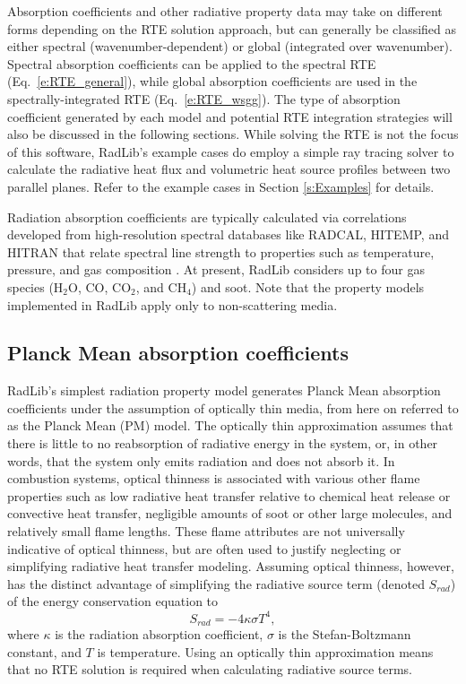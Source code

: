 \documentclass[preprint,12pt]{elsarticle}
\begin{document}
Absorption coefficients and other radiative property data may take on different forms depending on the RTE solution approach, but can generally be classified as either spectral (wavenumber-dependent) or global (integrated over wavenumber). Spectral absorption coefficients can be applied to the spectral RTE (Eq.~\ref{e:RTE_general}), while global absorption coefficients are used in the spectrally-integrated RTE (Eq.~\ref{e:RTE_wsgg}). The type of absorption coefficient generated by each model and potential RTE integration strategies will also be discussed in the following sections. While solving the RTE is not the focus of this software, RadLib's example cases do employ a simple ray tracing solver to calculate the radiative heat flux and volumetric heat source profiles between two parallel planes. Refer to the example cases in Section \ref{s:Examples} for details. 

Radiation absorption coefficients are typically calculated via correlations developed from high-resolution spectral databases like RADCAL, HITEMP, and HITRAN \citep{Grosshandler_1993,Rothman_2010} that relate spectral line strength to properties such as temperature, pressure, and gas composition \citep{Zhang_2002b}. At present, RadLib considers up to four gas species (H$_2$O, CO, CO$_2$, and CH$_4$) and soot. Note that the property models implemented in RadLib apply only to non-scattering media. 


\subsection{Planck Mean absorption coefficients} \label{s:planckmean}

RadLib's simplest radiation property model generates Planck Mean absorption coefficients under the assumption of optically thin media, from here on referred to as the Planck Mean (PM) model.
The optically thin approximation assumes that there is little to no reabsorption of radiative energy in the system, or, in other words, that the system only emits radiation and does not absorb it. In combustion systems, optical thinness is associated with various other flame properties such as low radiative heat transfer relative to chemical heat release or convective heat transfer, negligible amounts of soot or other large molecules, and relatively small flame lengths. These flame attributes are not universally indicative of optical thinness, but are often used to justify neglecting or simplifying radiative heat transfer modeling. Assuming optical thinness, however, has the distinct advantage of simplifying the radiative source term (denoted $S_{rad}$) of the energy conservation equation to 
\begin{equation}
	S_{rad}=-4\kappa \sigma T^4,
\end{equation}
where $\kappa$ is the radiation absorption coefficient, $\sigma$ is the Stefan-Boltzmann constant, and $T$ is temperature. Using an optically thin approximation means that no RTE solution is required when calculating radiative source terms.
\end{document}
